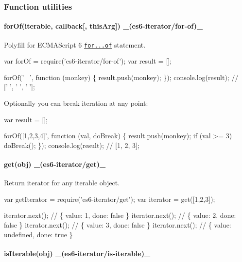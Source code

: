 \subsubsection*{Function utilities}

\paragraph*{for\+Of(iterable, callback\mbox{[}, this\+Arg\mbox{]}) \+\_\+(es6-\/iterator/for-\/of)\+\_\+}

Polyfill for E\+C\+M\+A\+Script 6 \href{https://developer.mozilla.org/en-US/docs/Web/JavaScript/Reference/Statements/for...of}{\tt {\ttfamily for...of}} statement.


\begin{DoxyCode}
var forOf = require('es6-iterator/for-of');
var result = [];

forOf('🙈🙉🙊', function (monkey) \{ result.push(monkey); \});
console.log(result); // ['🙈', '🙉', '🙊'];
\end{DoxyCode}


Optionally you can break iteration at any point\+:


\begin{DoxyCode}
var result = [];

forOf([1,2,3,4]', function (val, doBreak) \{
  result.push(monkey);
  if (val >= 3) doBreak();
\});
console.log(result); // [1, 2, 3];
\end{DoxyCode}


\paragraph*{get(obj) \+\_\+(es6-\/iterator/get)\+\_\+}

Return iterator for any iterable object.


\begin{DoxyCode}
var getIterator = require('es6-iterator/get');
var iterator = get([1,2,3]);

iterator.next(); // \{ value: 1, done: false \}
iterator.next(); // \{ value: 2, done: false \}
iterator.next(); // \{ value: 3, done: false \}
iterator.next(); // \{ value: undefined, done: true \}
\end{DoxyCode}


\paragraph*{is\+Iterable(obj) \+\_\+(es6-\/iterator/is-\/iterable)\+\_\+}

